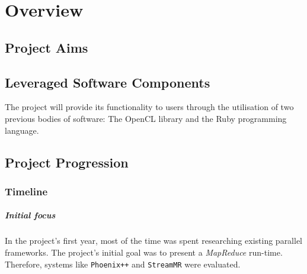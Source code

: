 \chapter{Overview}

\section{Project Aims}


\section{Leveraged Software Components}
The project will provide its functionality to users through the utilisation of two previous bodies of software: The \ac{OpenCL} library and the Ruby programming language.





\section{Project Progression}
\subsection{Timeline}
\paragraph*{Initial focus}
In the project's first year, most of the time was spent researching existing parallel frameworks. The project's initial goal was to present a \emph{MapReduce} run-time. Therefore, systems like \verb|Phoenix++|\cite{phoenix++} and \verb|StreamMR|\cite{streammr} were evaluated.

